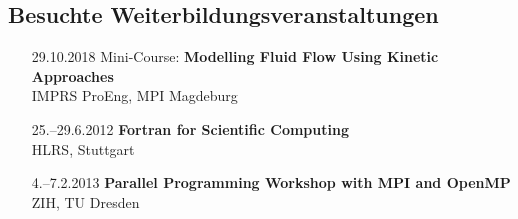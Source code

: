 \documentclass[oneside]{scrartcl}
\begin{document}
\subsection*{Besuchte Weiterbildungsveranstaltungen}
%
\begin{enumerate}
    \item[29.10.2018] Mini-Course: \textbf{Modelling Fluid Flow Using Kinetic Approaches}\\
                      IMPRS ProEng, MPI Magdeburg
    \item[25.--29.6.2012] \textbf{Fortran for Scientific Computing}\\
                          HLRS, Stuttgart
    \item[4.--7.2.2013] \textbf{Parallel Programming Workshop with MPI and OpenMP}\\
                  ZIH, TU Dresden
\end{enumerate}
%
\end{document}
